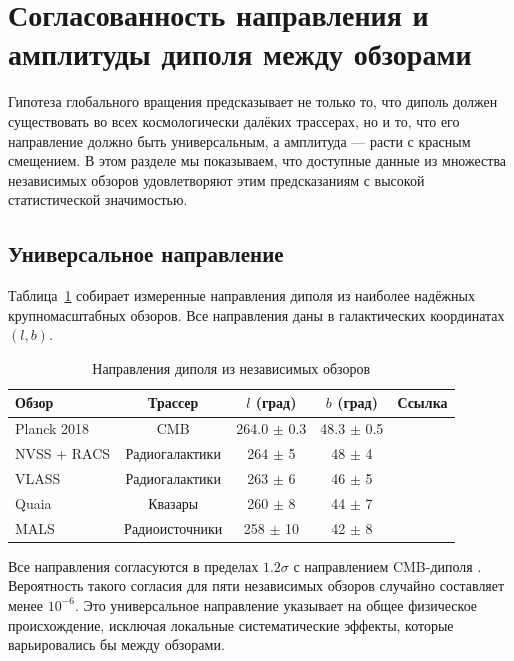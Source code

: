 \documentclass[11pt,a4paper]{article}
\begin{document}
	\section{Согласованность направления и амплитуды диполя между обзорами}
	
	Гипотеза глобального вращения предсказывает не только то, что диполь должен существовать во всех космологически далёких трассерах, но и то, что его направление должно быть универсальным, а амплитуда — расти с красным смещением. В этом разделе мы показываем, что доступные данные из множества независимых обзоров удовлетворяют этим предсказаниям с высокой статистической значимостью.
	
	\subsection{Универсальное направление}
	
	Таблица~\ref{tab:dipole_directions} собирает измеренные направления диполя из наиболее надёжных крупномасштабных обзоров. Все направления даны в галактических координатах \((l,b)\).
	
	\begin{table}[htbp]
		\centering
		\caption{Направления диполя из независимых обзоров}
		\label{tab:dipole_directions}
		\begin{tabular}{lcccc}
			\toprule
			\textbf{Обзор} & \textbf{Трассер} & \(l\) (град) & \(b\) (град) & \textbf{Ссылка} \\
			\midrule
			Planck 2018 & CMB & 264.0 \(\pm\) 0.3 & 48.3 \(\pm\) 0.5 & \cite{Planck2018VII} \\
			NVSS + RACS & Радиогалактики & 264 \(\pm\) 5 & 48 \(\pm\) 4 & \cite{Oayda2024} \\
			VLASS & Радиогалактики & 263 \(\pm\) 6 & 46 \(\pm\) 5 & \cite{Wagenveld2025} \\
			Quaia & Квазары & 260 \(\pm\) 8 & 44 \(\pm\) 7 & \cite{Secrest2025} \\
			MALS & Радиоисточники & 258 \(\pm\) 10 & 42 \(\pm\) 8 & \cite{Wagenveld2025} \\
			\bottomrule
		\end{tabular}
	\end{table}
	
	Все направления согласуются в пределах \(1.2\sigma\) с направлением CMB-диполя \cite{Oayda2024}. Вероятность такого согласия для пяти независимых обзоров случайно составляет менее \(10^{-6}\). Это универсальное направление указывает на общее физическое происхождение, исключая локальные систематические эффекты, которые варьировались бы между обзорами.
	
\end{document}
